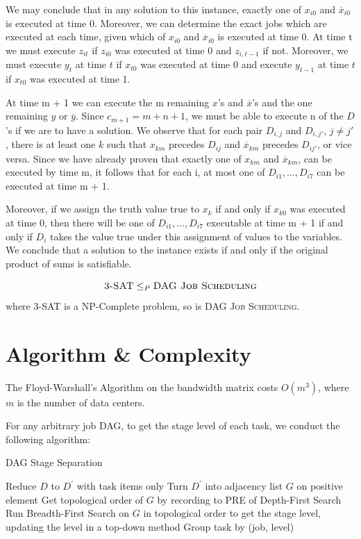 \documentclass{llncs}
\begin{document}
We may conclude that in any solution to this instance, exactly one of $x_{i0}$ and $\overline x_{i0}$ is executed at time 0. Moreover, we can determine the exact jobs which are executed at each time, given which of $x_{i0}$ and $\overline x_{i0}$ is executed at time 0. At time t we must execute $z_{it}$ if $z_{i0}$ was executed at time 0 and $z_{i,t-1}$ if not. Moreover, we must execute $y_t$ at time $t$ if $x_{t0}$ was executed at time 0 and execute $y_{t-1}$ at time $t$ if $x_{t0}$ was executed at time 1.

At time m + 1 we can execute the m remaining $x$'s and $\overline x$'s and the one remaining $y$ or $\overline y$. Since $c_{m+1}=m+n+1$, we must be able to execute n of the $D$'s if we are to have a solution. We observe that for each pair $D_{i,j}$ and $D_{i,j'}$, $j \neq j'$, there is at least one $k$ such that $x_{km}$ precedes $D_{ij}$ and $\overline x_{km}$ precedes $D_{ij'}$, or vice versa. Since we have already proven that exactly one of $x_{km}$ and $\overline x_{km}$, can be executed by time m, it follows that for each i, at most one of $D_{i1},\ldots,D_{i7}$ can be executed at time m + 1.

Moreover, if we assign the truth value true to $x_k$ if and only if $x_{k0}$ was executed at time 0, then there will be one of $D_{i1},\ldots,D_{i7}$ executable at time m + 1 if and only if $D_i$ takes the value true under this assignment of values to the variables. We conclude that a solution to the instance  exists if and only if the original product of sums is satisfiable.\cite{ULLMAN1975384}

\begin{equation*}
    \text{\textsc{3-SAT}} \leq_P \text{\textsc{DAG Job Scheduling}}
\end{equation*}
where \textsc{3-SAT} is a NP-Complete problem, so is \textsc{DAG Job Scheduling}.

\section{Algorithm \& Complexity}

The Floyd-Warshall's Algorithm on the bandwidth matrix costs $O(m^3)$, where $m$ is the number of data centers.

For any arbitrary job DAG, to get the stage level of each task, we conduct the following algorithm:
\begin{algorithm}[h]
\caption{DAG Stage Separation}
Reduce $D$ to $D^\prime$ with task items only\;
Turn $D^\prime$ into adjacency list $G$ on positive element\;
Get topological order of $G$ by recording to \textsc{PRE} of Depth-First Search\;
Run Breadth-First Search on $G$ in topological order to get the stage level, updating the level in a top-down method\;
Group task by (job, level)\;
\end{algorithm}
\end{document}
